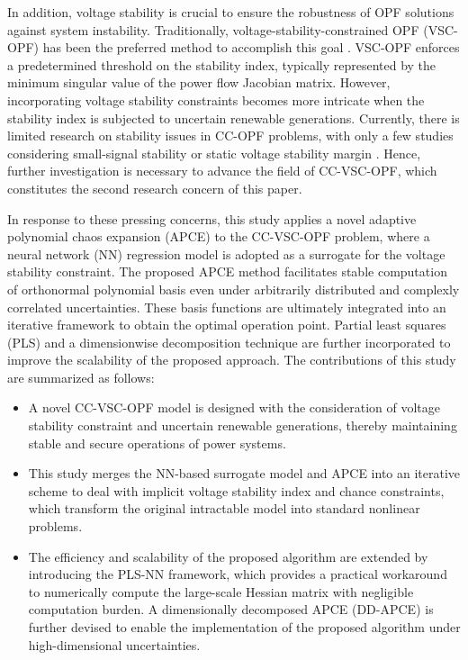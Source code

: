 \documentclass[journal]{IEEEtran}
\theoremstyle{definition}
\theoremstyle{remark}
\begin{document}
 In addition, voltage stability is crucial to ensure the robustness of OPF solutions against system instability. Traditionally, voltage-stability-constrained OPF (VSC-OPF) has been the preferred method to accomplish this goal \cite{jia2023voltage,cui2018new,avalos2008practical}. VSC-OPF enforces a predetermined threshold on the stability index, typically represented by the minimum singular value of the power flow Jacobian matrix.
 However, incorporating voltage stability constraints becomes more intricate when the stability index is subjected to uncertain renewable generations. Currently, there is limited research on stability issues in CC-OPF problems, with only a few studies considering small-signal stability \cite{wang2023stability} or static voltage stability margin \cite{yang2022optimization}. Hence, further investigation is necessary to advance the field of CC-VSC-OPF, which constitutes the second research concern of this paper.

In response to these pressing concerns, this study applies a novel adaptive polynomial chaos expansion (APCE) \cite{lee2020practical} to the CC-VSC-OPF problem, where a neural network (NN) regression model is adopted as a surrogate for the voltage stability constraint. The proposed APCE method facilitates stable computation of orthonormal polynomial basis even under arbitrarily distributed and complexly correlated uncertainties. These basis functions are ultimately integrated into an iterative framework to obtain the optimal operation point. Partial least squares (PLS) and a dimensionwise decomposition technique are further incorporated to improve the scalability of the proposed approach. The contributions of this study are summarized as follows:
\begin{itemize}
\item A novel CC-VSC-OPF model is designed with the consideration of voltage stability constraint and uncertain renewable generations, thereby maintaining stable and secure operations of power systems. 
\item This study merges the NN-based surrogate model and APCE into an iterative scheme to deal with implicit voltage stability index and chance constraints, which transform the original intractable model into standard nonlinear problems.
\item The efficiency and scalability of the proposed algorithm are extended by introducing the PLS-NN framework, which provides a practical workaround to numerically compute the large-scale Hessian matrix with negligible computation burden. A dimensionally decomposed APCE (DD-APCE) is further devised to enable the implementation of the proposed algorithm under high-dimensional uncertainties. 
\end{itemize}
\end{document}
